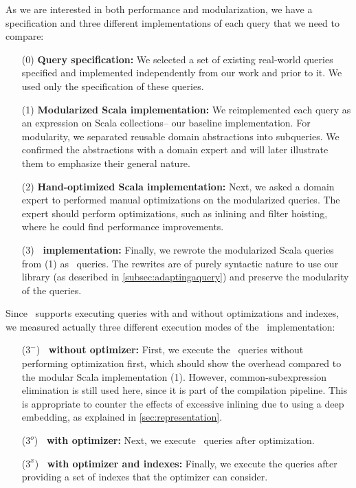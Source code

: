 \label{sec:implemenationsandspeedups}
As we are interested in both performance and modularization, we have a specification and three different implementations of each query that we need to compare:
\begin{enumerate}
	\item[(0)] \textbf{Query specification:} We selected a set of existing real-world queries specified and implemented independently from our work and prior to it. We used only the specification of these queries.

	\item[(1)] \textbf{Modularized Scala implementation:} 
	We reimplemented each query as an expression on Scala collections\--- our baseline implementation. For modularity, we separated reusable domain abstractions into subqueries. We confirmed the abstractions with a domain expert and will later illustrate them to emphasize their general nature.
	\item[(2)] \textbf{Hand-optimized Scala implementation:} Next, we asked a domain expert to performed manual optimizations on the modularized queries. The expert should perform optimizations, such as inlining and filter hoisting, where he could find performance improvements.
	\item[(3)] \textbf{\LoS\ implementation:} Finally, we rewrote the modularized Scala queries from (1) as \LoS\ queries. The rewrites are of purely syntactic nature to use our library (as described in \cref{subsec:adaptingaquery}) and preserve the modularity of the queries.
\end{enumerate}

Since \LoS\ supports executing queries with and without optimizations and indexes, we measured actually three different execution modes of the \LoS\ implementation:
\begin{enumerate}
	\item[($3^-$)] \textbf{\LoS\ without optimizer:} First, we execute the \LoS\ queries without performing optimization first, which should show the \LoS{} overhead compared to the modular Scala implementation (1).
However, common-subexpression elimination is still used here, since it is part of the compilation pipeline. This is appropriate to counter the effects of excessive inlining due to using a deep embedding, as explained in \cref{sec:representation}.
	\item[($3^o$)] \textbf{\LoS\ with optimizer:} Next, we execute \LoS\ queries after optimization.
	\item[($3^x$)] \textbf{\LoS\ with optimizer and indexes:} Finally, we execute the queries after providing a set of indexes that the optimizer can consider.
\end{enumerate}

